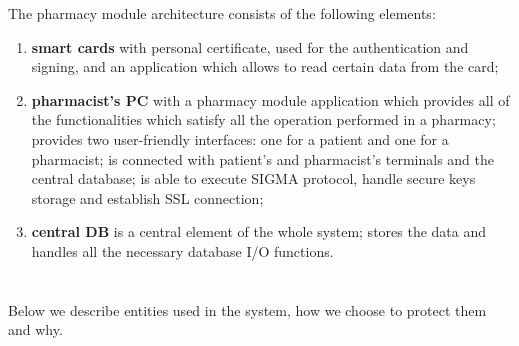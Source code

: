 The pharmacy module architecture consists of the following elements:
\begin{enumerate}
\item \textbf{smart cards} with personal certificate, used for the authentication and signing, and an application which allows to read certain data from the card;
\item \textbf{pharmacist's PC} with a pharmacy module application which provides all of the functionalities which satisfy all the operation performed in a pharmacy; provides two user-friendly interfaces: one for a patient and one for a pharmacist; is connected with patient’s and pharmacist’s terminals and the central database; is able to execute SIGMA protocol, handle secure keys storage and establish SSL connection;
\item{\textbf{central DB}} is a central element of the whole system; stores the data and handles all the necessary database I/O functions.
\end{enumerate}
\newpage
\section{}

Below we describe entities used in the system, how we choose to protect them and why.

\subsection{}

\subsubsection{}

